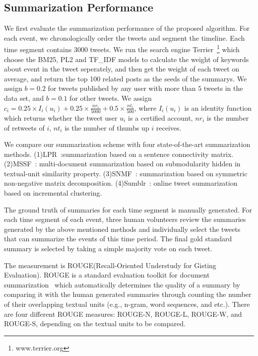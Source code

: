 \documentclass[runningheads]{llncs}
\begin{document}
\subsection{Summarization Performance}
We first evaluate the summarization performance of the proposed algorithm. For each event, we chronologically order the tweets and segment the timeline. Each time segment contains 3000 tweets. We run the search engine Terrier~\footnote{www.terrier.org} which choose the  BM25, PL2 and TF\_IDF models to calculate the weight of keywords about event in the tweet seperately, and then get the weight of each tweet on average, and return the top 100 related posts as the seeds of the summarys. We assign $b=0.2$ for tweets published by any user with more than $5$ tweets in the data set, and $b=0.1$ for other tweets. We assign $c_i=0.25\times I_i(u_i) + 0.25\times \frac{nr_i}{5000}+ 0.5 \times \frac{nt_i}{500}$, where $I_i(u_i)$ is an identity function which returns whether the tweet user $u_i$ is a certified account, $nr_i$ is the number of retweets of $i$, $nt_i$ is the number of thumbs up  $i$ receives.

We compare our summarization scheme with  four state-of-the-art summarization methods. (1)LPR~\cite{LPR}:summarization based on a sentence connectivity matrix. (2)MSSF~\cite{MSSF}:  multi-document summarization based on submodularity hidden in textual-unit similarity property. (3)SNMF~\cite{SNMF}: summarization based on  symmetric non-negative matrix decomposition. (4)Sumblr~\cite{Shou2013Sumblr}: online tweet summarization based on incremental clustering.

The ground truth of summaries for each time segment is manually generated. For each time segment of each event, three human volunteers review the summaries generated by the above mentioned methods and individually select the tweets that can summarize the events of this time period. The final gold standard summary is selected by taking a simple majority vote on each tweet.

The measurement is ROUGE(Recall-Oriented Understudy for Gisting Evaluation). ROUGE is a standard evaluation toolkit for document summarization~\cite{ROUGE} which automatically determines the quality of a summary by comparing it with the human generated summaries through counting the number of their overlapping textual units (e.g., n-gram, word sequences, and etc.). There are four different ROUGE measures: ROUGE-N, ROUGE-L, ROUGE-W, and ROUGE-S, depending on the textual units to be compared.
\end{document}
